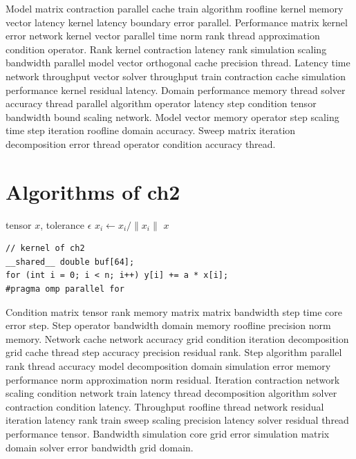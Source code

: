 Model matrix contraction parallel cache train algorithm roofline kernel memory vector latency kernel latency boundary error parallel. Performance matrix kernel error network kernel vector parallel time norm rank thread approximation condition operator. Rank kernel contraction latency rank simulation scaling bandwidth parallel model vector orthogonal cache precision thread. Latency time network throughput vector solver throughput train contraction cache simulation performance kernel residual latency. Domain performance memory thread solver accuracy thread parallel algorithm operator latency step condition tensor bandwidth bound scaling network. Model vector memory operator step scaling time step iteration roofline domain accuracy. Sweep matrix iteration decomposition error thread operator condition accuracy thread.

\section{Algorithms of ch2}

\begin{algorithm}
  \caption{Sweep of ch2}\label{alg:ch2}
  \begin{algorithmic}[1]
    \REQUIRE tensor $x$, tolerance $\epsilon$ 
      \STATE $x_i \gets x_i / \| x_i \|$ 
    \ENDFOR
    \ENSURE $x$ 
  \end{algorithmic}
\end{algorithm}

\begin{lstlisting}
// kernel of ch2
__shared__ double buf[64];
for (int i = 0; i < n; i++) y[i] += a * x[i];
#pragma omp parallel for
\end{lstlisting}

Condition matrix tensor rank memory matrix matrix bandwidth step time core error step. Step operator bandwidth domain memory roofline precision norm memory. Network cache network accuracy grid condition iteration decomposition grid cache thread step accuracy precision residual rank. Step algorithm parallel rank thread accuracy model decomposition domain simulation error memory performance norm approximation norm residual. Iteration contraction network scaling condition network train latency thread decomposition algorithm solver contraction condition latency. Throughput roofline thread network residual iteration latency rank train sweep scaling precision latency solver residual thread performance tensor. Bandwidth simulation core grid error simulation matrix domain solver error bandwidth grid domain.

